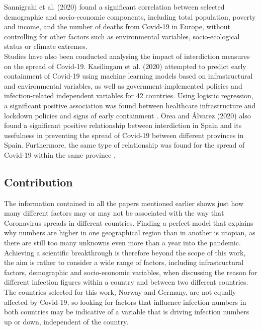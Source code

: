 Sannigrahi et al. (2020) found a significant correlation between selected demographic and socio-economic components, including total population, poverty and income, and the number of deaths from Covid-19 in Europe, without controlling for other factors such as environmental variables, socio-ecological status or climate extremes\autocite[][]{sannigrahi2020examining}. \\
Studies have also been conducted analysing the impact of interdiction measures on the spread of Covid-19. Kasilingam et al. (2020) attempted to predict early containment of Covid-19 using machine learning models based on infrastructural and environmental variables, as well as government-implemented policies and infection-related independent variables for 42 countries. Using logistic regression, a significant positive association was found between healthcare infrastructure and lockdown policies and signs of early containment \autocite[][]{kasilingam2020exploring}.
Orea and Álvarez (2020) also found a significant positive relationship between interdiction in Spain and its usefulness in preventing the spread of Covid-19 between different provinces in Spain. Furthermore, the same type of relationship was found for the spread of Covid-19 within the same province \autocite[][]{orea2020effective}. \\
\subsection*{Contribution}
The information contained in all the papers mentioned earlier shows just how many different factors may or may not be associated with the way that Coronavirus spreads in different countries. Finding a perfect model that explains why numbers are higher in one geographical region than in another is utopian, as there are still too many unknowns even more than a year into the pandemic. Achieving a scientific breakthrough is therefore beyond the scope of this work, the aim is rather to consider a wide range of factors, including infrastructural factors, demographic and socio-economic variables, when discussing the reason for different infection figures within a country and between two different countries. The countries selected for this work, Norway and Germany, are not equally affected by Covid-19, so looking for factors that influence infection numbers in both countries may be indicative of a variable that is driving infection numbers up or down, independent of the country.
\clearpage
